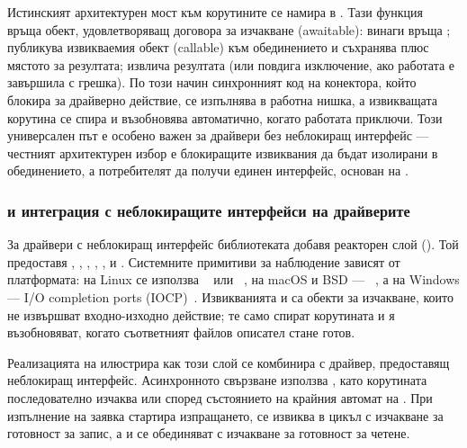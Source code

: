 Истинският архитектурен мост към корутините се намира в . Тази функция връща обект, удовлетворяващ договора за изчакване (awaitable):  винаги връща ;  публикува извикваемия обект (callable) към обединението и съхранява  плюс мястото за резултата;  извлича резултата (или повдига изключение, ако работата е завършила с грешка). По този начин синхронният код на конектора, който блокира за драйверно действие, се изпълнява в работна нишка, а извикващата корутина се спира и възобновява автоматично, когато работата приключи. Този универсален път е особено важен за драйвери без неблокиращ интерфейс --- честният архитектурен избор е блокиращите извиквания да бъдат изолирани в обединението, а потребителят да получи единен интерфейс, основан на .

\subsubsection{ и интеграция с неблокиращите интерфейси на драйверите}

За драйвери с неблокиращ интерфейс библиотеката добавя реакторен слой  (). Той предоставя , , , , ,  и . Системните примитиви за наблюдение зависят от платформата: на Linux се използва ~\cite{epoll_man} или ~\cite{io_uring}, на macOS и BSD --- ~\cite{kqueue_man}, а на Windows --- I/O completion ports (IOCP)~\cite{iocp_msdn}. Извикванията  и  са обекти за изчакване, които не извършват входно-изходно действие; те само спират корутината и я възобновяват, когато съответният файлов описател стане готов.

Реализацията на  илюстрира как този слой се комбинира с драйвер, предоставящ неблокиращ интерфейс. Асинхронното свързване използва , като корутината последователно изчаква  или  според състоянието на крайния автомат на . При изпълнение на заявка  стартира изпращането,  се извиква в цикъл с изчакване за готовност за запис, а  и  се обединяват с изчакване за готовност за четене.

